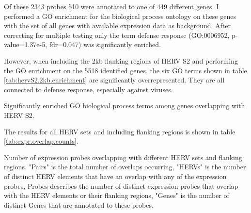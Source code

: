 \documentclass[a4paper,12pt]{article}
\begin{document}
Of these 2343 probes 510 were annotated to one of 449 different genes. I performed a GO enrichment for the biological process ontology on these genes with the set of all genes with available expression data as background. After correcting for multiple testing only the term defense response (GO:0006952, p-value=1.37e-5, fdr=0.047) was significantly enriched.

However, when including the 2kb flanking regions of HERV S2 and performing the GO enrichment on the 5518 identified genes, the six GO terms shown in table \ref{tab:hervS2.2kb.enrichment} are significantly overrepresented. They are all connected to defense response, especially against viruses.

\begin{table}[h!]
  \begin{center}
  \end{center}        
	\caption{Significantly enriched GO biological process terms among genes overlapping with HERV S2.}
	\label{tab:hervS2.expr.overlap.counts}
\end{table}


The results for all HERV sets and including flanking regions is shown in table \ref{tab:expr.overlap.counts}.

\begin{table}[h!]
  \begin{center}
  \end{center}        
	\caption{Number of expression probes overlapping with different HERV sets and flanking regions. "Pairs" is the total number of overlaps occurring, "HERVs" is the number of distinct HERV elements that have an overlap with any of the expression probes, Probes describes the number of distinct expression probes that overlap with the HERV elements or their flanking regions, "Genes" is the number of distinct Genes that are annotated to these probes.}
	\label{tab:expr.overlap.counts}
\end{table}
\end{document}
